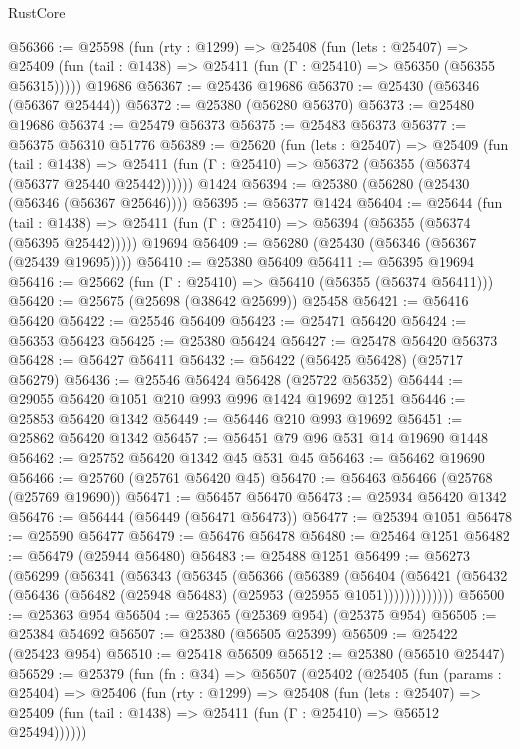 \begin{lexlean}{RustCore}
\begin{coremodule}
@56366 := @25598
    (fun (rty : @1299) =>
    @25408
      (fun (lets : @25407) =>
      @25409 (fun (tail : @1438) => @25411 (fun (Γ : @25410) => @56350 (@56355 @56315)))))
    @19686
@56367 := @25436 @19686
@56370 := @25430 (@56346 (@56367 @25444))
@56372 := @25380 (@56280 @56370)
@56373 := @25480 @19686
@56374 := @25479 @56373
@56375 := @25483 @56373
@56377 := @56375 @56310 @51776
@56389 := @25620
    (fun (lets : @25407) =>
    @25409
      (fun (tail : @1438) =>
      @25411 (fun (Γ : @25410) => @56372 (@56355 (@56374 (@56377 @25440 @25442))))))
    @1424
@56394 := @25380 (@56280 (@25430 (@56346 (@56367 @25646))))
@56395 := @56377 @1424
@56404 := @25644
    (fun (tail : @1438) => @25411 (fun (Γ : @25410) => @56394 (@56355 (@56374 (@56395 @25442)))))
    @19694
@56409 := @56280 (@25430 (@56346 (@56367 (@25439 @19695))))
@56410 := @25380 @56409
@56411 := @56395 @19694
@56416 := @25662 (fun (Γ : @25410) => @56410 (@56355 (@56374 @56411)))
@56420 := @25675 (@25698 (@38642 @25699)) @25458
@56421 := @56416 @56420
@56422 := @25546 @56409
@56423 := @25471 @56420
@56424 := @56353 @56423
@56425 := @25380 @56424
@56427 := @25478 @56420 @56373
@56428 := @56427 @56411
@56432 := @56422 (@56425 @56428) (@25717 @56279)
@56436 := @25546 @56424 @56428 (@25722 @56352)
@56444 := @29055 @56420 @1051 @210 @993 @996 @1424 @19692 @1251
@56446 := @25853 @56420 @1342
@56449 := @56446 @210 @993 @19692
@56451 := @25862 @56420 @1342
@56457 := @56451 @79 @96 @531 @14 @19690 @1448
@56462 := @25752 @56420 @1342 @45 @531 @45
@56463 := @56462 @19690
@56466 := @25760 (@25761 @56420 @45)
@56470 := @56463 @56466 (@25768 (@25769 @19690))
@56471 := @56457 @56470
@56473 := @25934 @56420 @1342
@56476 := @56444 (@56449 (@56471 @56473))
@56477 := @25394 @1051
@56478 := @25590 @56477
@56479 := @56476 @56478
@56480 := @25464 @1251
@56482 := @56479 (@25944 @56480)
@56483 := @25488 @1251
@56499 := @56273
    (@56299
      (@56341
        (@56343
          (@56345
            (@56366
              (@56389
                (@56404
                  (@56421 (@56432 (@56436 (@56482 (@25948 @56483) (@25953 (@25955 @1051)))))))))))))
@56500 := @25363 @954
@56504 := @25365 (@25369 @954) (@25375 @954)
@56505 := @25384 @54692
@56507 := @25380 (@56505 @25399)
@56509 := @25422 (@25423 @954)
@56510 := @25418 @56509
@56512 := @25380 (@56510 @25447)
@56529 := @25379
    (fun (fn : @34) =>
    @56507
      (@25402
        (@25405
          (fun (params : @25404) =>
          @25406
            (fun (rty : @1299) =>
            @25408
              (fun (lets : @25407) =>
              @25409 (fun (tail : @1438) => @25411 (fun (Γ : @25410) => @56512 @25494))))))

\end{coremodule}
\end{lexlean}
